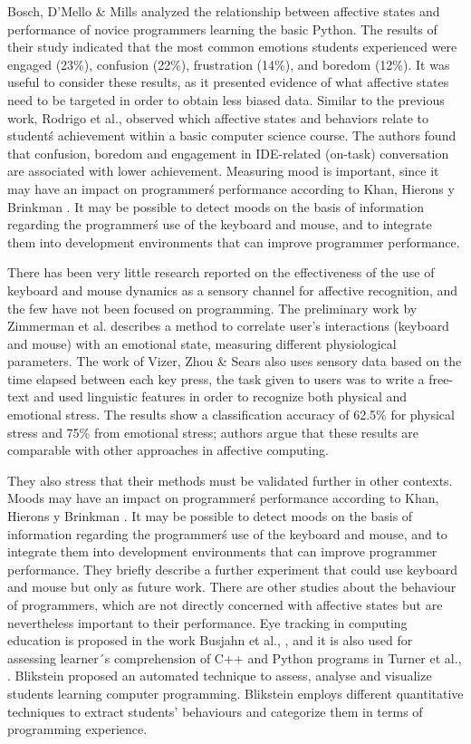 \documentclass[a4paper,twoside]{article}
\begin{document}
Bosch, D'Mello \& Mills \cite{bosch2013emotions} analyzed the relationship between affective states
and performance of novice programmers learning the basic Python. The results of their study
indicated that the most common emotions students experienced were engaged
(23\%), confusion (22\%), frustration (14\%), and boredom (12\%). It was useful
to consider these results, as it presented evidence of what affective states
need to be targeted in order to obtain less biased data. Similar to
the previous work, Rodrigo et al., \cite{rodrigo2009affective} observed which affective states and
behaviors relate to student\'s achievement within a basic computer science
course. The authors found that confusion, boredom and engagement in IDE-related
(on-task) conversation are associated with lower achievement. Measuring mood is important, 
since it may have an impact on programmer\'s performance according
to Khan, Hierons y Brinkman \cite{khan2007mood}. It may be possible to detect moods
on the basis of information regarding the programmer\'s use of the keyboard and
mouse, and to integrate them into development environments that can improve
programmer performance. 

There has been very little research reported on the effectiveness of the use of
keyboard and mouse dynamics as a sensory channel for affective recognition, and
the few have not been focused on programming. The preliminary work by Zimmerman
et al. \cite{zimmermann2003affective} describes a method to correlate user’s interactions (keyboard and
mouse) with an emotional state, measuring different physiological parameters. The work of Vizer, Zhou \& Sears \cite{vizer2009automated} also
uses sensory data based on the time elapsed between each key press, the task
given to users was to write a free-text and used linguistic features in order to
recognize both physical and emotional stress. The results show a classification
accuracy of 62.5\% for physical stress and 75\% from emotional stress; authors
argue that these results are comparable with other approaches in affective
computing.

They also stress that their methods must be validated further in
other contexts. Moods may have an impact on programmer\'s performance according
to Khan, Hierons y Brinkman \cite{khan2007mood}. It may be possible to detect moods
on the basis of information regarding the programmer\'s use of the keyboard and
mouse, and to integrate them into development environments that can improve
programmer performance. They briefly describe a further experiment that could
use keyboard and mouse but only as future work. There are other studies about
the behaviour of programmers, which are not directly concerned with affective
states but are nevertheless important to their performance. Eye tracking in
computing education is proposed in the work Busjahn et al., \cite{busjahn2014eye}, and it is
also used for assessing learner´s comprehension of C++ and Python programs in
Turner et al., \cite{turner2014eye}. Blikstein \cite{blikstein2011using} proposed 
an automated technique to
assess, analyse and visualize students learning computer programming. Blikstein
employs different quantitative techniques to extract students’ behaviours and
categorize them in terms of programming experience.
\end{document}
